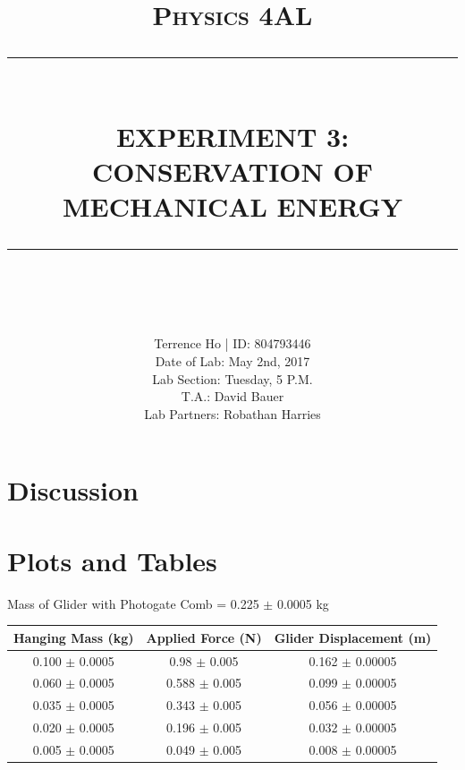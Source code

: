 \documentclass[11pt]{report}
\newcommand{\HRule}[1]{\rule{\linewidth}{#1}}
\begin{document}
\title{ \normalsize \textsc{Physics 4AL}
        \\ [2.0cm]
        \HRule{0.5pt} \\
        \LARGE \textbf{\uppercase{Experiment 3: Conservation of Mechanical Energy}}
        \HRule{2pt} \\ [0.5cm]
        \vspace*{2\baselineskip}}

\date{}

\author{
        Terrence Ho | ID: 804793446 \\ 
        Date of Lab: May 2nd, 2017 \\
        Lab Section: Tuesday, 5 P.M.\\
        T.A.: David Bauer\\
        Lab Partners: Robathan Harries}

\maketitle
\tableofcontents
\newpage

\sectionfont{\scshape}


\section*{Discussion}

\section*{Plots and Tables}
Mass of Glider with Photogate Comb = 0.225 $\pm$ 0.0005 kg

\begin{center}
    \begin{tabular}{| c | c | c |}
        \hline
        Hanging Mass (kg) & Applied Force (N) & Glider Displacement (m) \\
        \hline
        0.100 $\pm$ 0.0005  & 0.98 $\pm$ 0.005 & 0.162 $\pm$ 0.00005 \\
        \hline
        0.060 $\pm$ 0.0005 & 0.588 $\pm$ 0.005 & 0.099 $\pm$ 0.00005 \\
        \hline
        0.035 $\pm$ 0.0005 & 0.343 $\pm$ 0.005 & 0.056 $\pm$ 0.00005 \\
        \hline
        0.020 $\pm$ 0.0005 & 0.196 $\pm$ 0.005 & 0.032 $\pm$ 0.00005 \\
        \hline
        0.005 $\pm$ 0.0005 & 0.049 $\pm$ 0.005 & 0.008 $\pm$ 0.00005 \\
        \hline
    \end{tabular}
\end{center}
\end{document}
